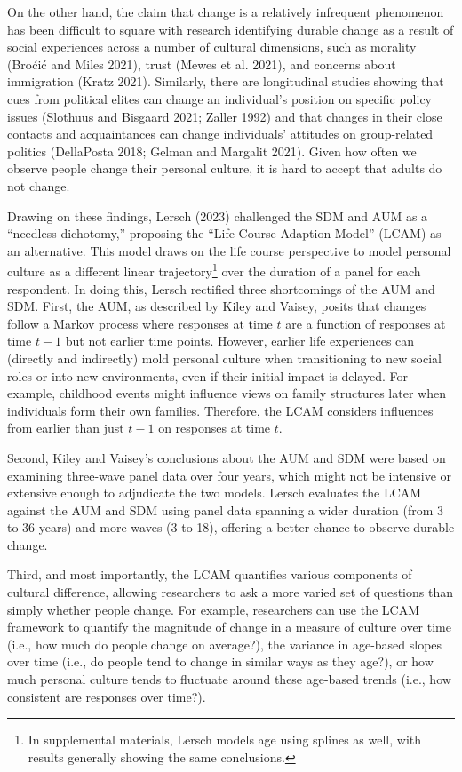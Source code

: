 \documentclass[
  12pt,
]{article}
\begin{document}
On the other hand, the claim that change is a relatively infrequent
phenomenon has been difficult to square with research identifying
durable change as a result of social experiences across a number of
cultural dimensions, such as morality (Broćić and Miles 2021), trust
(Mewes et al. 2021), and concerns about immigration (Kratz 2021).
Similarly, there are longitudinal studies showing that cues from
political elites can change an individual's position on specific policy
issues (Slothuus and Bisgaard 2021; Zaller 1992) and that changes in
their close contacts and acquaintances can change individuals' attitudes
on group-related politics (DellaPosta 2018; Gelman and Margalit 2021).
Given how often we observe people change their personal culture, it is
hard to accept that adults do not change.

Drawing on these findings, Lersch (2023) challenged the SDM and AUM as a
``needless dichotomy,'' proposing the ``Life Course Adaption Model''
(LCAM) as an alternative. This model draws on the life course
perspective to model personal culture as a different linear
trajectory\footnote{In supplemental materials, Lersch models age using
  splines as well, with results generally showing the same conclusions.}
over the duration of a panel for each respondent. In doing this, Lersch
rectified three shortcomings of the AUM and SDM. First, the AUM, as
described by Kiley and Vaisey, posits that changes follow a Markov
process where responses at time \(t\) are a function of responses at
time \(t-1\) but not earlier time points. However, earlier life
experiences can (directly and indirectly) mold personal culture when
transitioning to new social roles or into new environments, even if
their initial impact is delayed. For example, childhood events might
influence views on family structures later when individuals form their
own families. Therefore, the LCAM considers influences from earlier than
just \(t-1\) on responses at time \(t\).

Second, Kiley and Vaisey's conclusions about the AUM and SDM were based
on examining three-wave panel data over four years, which might not be
intensive or extensive enough to adjudicate the two models. Lersch
evaluates the LCAM against the AUM and SDM using panel data spanning a
wider duration (from 3 to 36 years) and more waves (3 to 18), offering a
better chance to observe durable change.

Third, and most importantly, the LCAM quantifies various components of
cultural difference, allowing researchers to ask a more varied set of
questions than simply whether people change. For example, researchers
can use the LCAM framework to quantify the magnitude of change in a
measure of culture over time (i.e., how much do people change on
average?), the variance in age-based slopes over time (i.e., do people
tend to change in similar ways as they age?), or how much personal
culture tends to fluctuate around these age-based trends (i.e., how
consistent are responses over time?).
\end{document}
